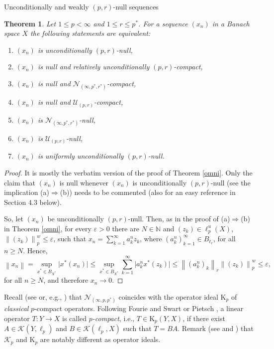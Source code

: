 \documentclass[a4paper,11pt]{amsart}
\newtheorem{thm}[prop]{Theorem}
\theoremstyle{definition}
\theoremstyle{definition}
\theoremstyle{definition}
\begin{document}
\begin{section}{Unconditionally and weakly ${{(p,r)}}$-null sequences}
\begin{thm}\label{omni_uncond}
Let $1 \leq p < \infty$ and $1 \leq r \leq {p^{\ast}}$. For a sequence $(x_n)$ in a Banach space $X$ the following statements are equivalent:
\begin{enumerate}
\item $(x_n)$ is unconditionally $(p,r)$-null,
\item $(x_n)$ is null and relatively unconditionally $(p,r)$-compact,
\item $(x_n)$ is null and ${{\mathcal N}}_{(\infty, {p^{\ast}}, {r^{\ast}})}$-compact,
\item $(x_n)$ is null and ${{\mathcal U}}_{(p,r)}$-compact,
\item $(x_n)$ is ${{\mathcal N}}_{(\infty, {p^{\ast}}, {r^{\ast}} )}$-null,
\item $(x_n)$ is ${{\mathcal U}}_{(p,r)}$-null,
\item $(x_n)$ is uniformly unconditionally $(p,r)$-null.
\end{enumerate}
\end{thm}
\begin{proof}
It is mostly the verbatim version of the proof of Theorem \ref{omni}. Only the claim that $(x_n)$ is null whenever $(x_n)$ is unconditionally ${{(p,r)}}$-null (see the implication (a)$\Rightarrow $(b)) needs to be commented (also for an easy reference in Section 4.3 below).

So, let $(x_n)$ be unconditionally ${{(p,r)}}$-null. Then, as in the proof of (a)$\Rightarrow$(b) in Theorem \ref{omni}, for every ${\varepsilon}>0$ there are $N\in {{\mathbb N}}$ and $(z_k)\in \ell_p^u(X)$, ${\left\lVert {(z_k)} \right\rVert}_p^w \leq {\varepsilon}$, such that $x_n= \sum _{k=1}^\infty a_k^n z_k$, where $(a_k^n)_{k=1}^\infty\in B_{\ell_r}$, for all $n \geq N$. Hence, 
\[
{\left\lVert {x_n} \right\rVert}=\sup_{{x^{\ast}} \in B_{X^{\ast}}} \vert {x^{\ast}} (x_n)\vert \leq \sup_{{x^{\ast}} \in B_{X^{\ast}}} \sum _{k=1}^\infty \vert a_k^n  {x^{\ast}} (z_k) \vert \leq {\left\lVert {(a_k^n)_k} \right\rVert}_r {\left\lVert {(z_k)} \right\rVert}_p^w \leq {\varepsilon},
\]
for all $n\geq N$, and therefore $x_n{\rightarrow} 0$.
\end{proof}

Recall (see \cite[Theorem~2.5]{FS2} or, e.g., \cite[18.3.2]{P}) that ${{\mathcal N}}_{(\infty, p, {p^{\ast}})}$ coincides with the operator ideal $\mathrm K_p$ of \emph{classical} $p$-compact operators. Following Fourie and Swart \cite{FS1} or Pietsch \cite[18.3.1~and~18.3.2]{P}, a linear operator $T: Y {\rightarrow} X$ is called \emph{$p$-compact}, i.e., $T\in \mathrm K_p(Y,X)$, if there exist $A\in {{\mathcal K}}(Y, \ell_p)$ and $B\in {{\mathcal K}}(\ell_p, X)$ such that $T=BA$. Remark (see \cite{O-JM} and \cite{P2}) that ${{\mathcal K}}_p$ and $\mathrm K_p$ are notably different as operator ideals. 


\end{section}
\end{document}
